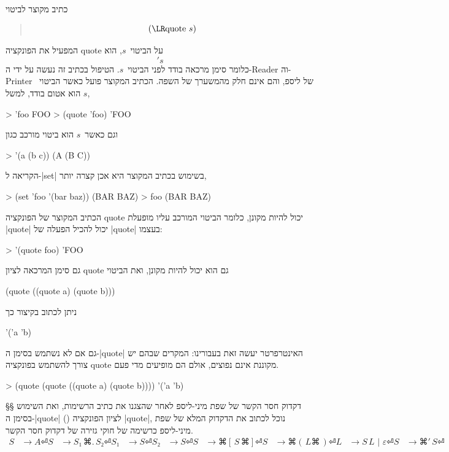 כתיב מקוצר לביטוי
\begin{LTR}
\begin{quote}
  \setLTR \[
    \text{(\E|quote~$s$|)}
\] \end{quote}
\end{LTR}
המפעיל את הפונקציה quote על הביטוי~$s$, הוא \[
  's
\] כלומר סימן מרכאה בודד
לפני הביטוי~$s$. הטיפול בכתיב זה נעשה על ידי
ה-Reader וה-Printer של ליספ, והם אינם חלק מהמשערך של השפה.
הכתיב המקוצר פועל כאשר הביטוי~$s$ הוא אטום בודד, למשל,
\begin{LISP}
> 'foo
FOO
> (quote 'foo)
'FOO
\end{LISP}
וגם כאשר~$s$ הוא ביטוי מורכב כגון
\begin{LISP}
> '(a (b c))
(A (B C))
\end{LISP}
הקריאה ל-\E|set| בשימוש בכתיב המקוצר היא אכן קצרה יותר,
\begin{LISP}
> (set 'foo '(bar baz))
(BAR BAZ)
> foo
(BAR BAZ)
\end{LISP}
הכתיב המקוצר של הפונקציה quote יכול להיות מקונן, כלומר הביטוי המורכב עליו
מופעלת \E|quote| יכול להכיל הפעלה של \E|quote| בעצמו:
\begin{LISP}
> '(quote foo)
'FOO
\end{LISP}
גם סימן המרכאה לציון quote גם הוא יכול להיות מקונן, ואת הביטוי
\begin{LISP}
(quote ((quote a) (quote b)))
\end{LISP}
ניתן לכתוב בקיצור כך
\begin{LISP}
'('a 'b)
\end{LISP}
גם אם לא נשתמש בסימן ה-\E|quote| האינטרפרטר יעשה זאת בעבורינו:
המקרים שבהם יש צורך להשתמש בפונקציה quote מקוננת אינם נפוצים, אולם הם מופיעים
מדי פעם.
\begin{LISP}
> (quote (quote ((quote a) (quote b))))
'('a 'b)
\end{LISP}

§§ דקדוק חסר הקשר של שפת מיני-ליספ
לאחר שהצגנו את כתיב הרשימות, ואת השימוש בסימן ה-\E|quote| () לציון
הפונקציה \E|quote|, נוכל לכתוב את הדקדוק המלא של שפת מיני-ליספ כרשימה של חוקי
גזירה של דקדוק חסר הקשר.
\begin{equation}
  \label{eq:ambigious}
  \begin{split}
    S &→A ⏎
    S &→S₁\, ⌘.\, S₂⏎
    S₁&→S ⏎
    S₂&→S ⏎
    S &→⌘[\, S\, ⌘] ⏎
    S &→⌘(\, L ⌘\,) ⏎
    L &→S \, L\,\, |\, \,ε ⏎
    S &→⌘'\,S ⏎
  \end{split}
\end{equation}


